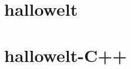 %

\section{hallowelt}

%
\lstset{language=C}%

\newpage
\section{hallowelt-C++}

%
\lstset{language=C++}%

\newpage
